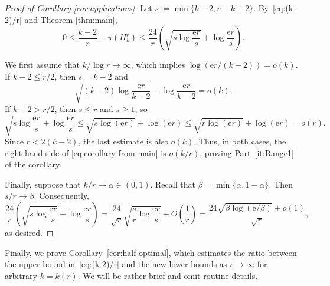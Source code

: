 \documentclass[12pt,a4paper]{article}
\numberwithin{equation}{section}
\theoremstyle{definition}
\theoremstyle{remark}
\newcommand{\hide}[1]{{\color{DarkGreen}#1}}
\renewcommand{\hide}[1]{}
\newcommand{\me}{\mathrm{e}}
\renewcommand{\longrightarrow}{\to}
\begin{document}
\begin{proof}[Proof of Corollary \ref{cor:applications}]
Let $s:=\min\{k-2,r-k+2\}$.
By~\eqref{eq:(k-2)/r} and Theorem \ref{thm:main},
\begin{equation}\label{eq:corollary-from-main}
0\le \frac{k-2}{r}-\pi(H_k^r)
\le \frac{24}{r}
\left(
\sqrt{s\log\frac{\me r}{s}}
+\log\frac{\me r}{s}
\right).
\end{equation}

\hide{
Suppose first that $k/\log r\to c\in(0,\infty)$. 
Then $(k-2)/\log r\to c$ and $k=o(r)$, so $s=k-2$ for all sufficiently large $r$. 
Moreover,
$$\frac{\log(\me r/(k-2))}{\log r}=1+\frac{1-\log(k-2)}{\log r}\longrightarrow 1.$$
It follows that
$$\frac{\log(\me r/(k-2))}{k-2}\longrightarrow \frac1c.$$
Multiplying \eqref{eq:corollary-from-main} by $r/(k-2)$, we obtain
$$0\le1-\frac{r\pi(H_k^r)}{k-2}\le24\left(\sqrt{\frac{\log(\me r/(k-2))}{k-2}}+\frac{\log(\me r/(k-2))}{k-2}\right).$$
Consequently,
$$0\le 1-\frac{r\pi(H_k^r)}{k-2}\le 24\left(c^{-1/2}+c^{-1}\right)+o(1),$$
which proves Part \textup{(i)} of Corollary \ref{cor:applications}.
}


We first assume that $k/\log r\to\infty$, which implies $\log(\me r/(k-2))=o(k)$.
If $k-2\le r/2$, then $s=k-2$ and
$$\sqrt{(k-2)\log\frac{\me r}{k-2}}+\log\frac{\me r}{k-2}=o(k).$$
If $k-2>r/2$, then $s\le r$ and $s\ge1$, so
$$\sqrt{s\log\frac{\me r}{s}}+\log\frac{\me r}{s}
\le \sqrt{s\log(\me r)}+\log(\me r)
\le \sqrt{r\log(\me r)}+\log(\me r)=o(r).$$
Since $r<2(k-2)$, the last estimate is also $o(k)$.
Thus, in both cases, the right-hand side of
\eqref{eq:corollary-from-main} is $o(k/r)$, proving
Part~\ref{it:Range1} of the corollary.

Finally, suppose that $k/r\to\alpha\in(0,1)$. Recall that $\beta=\min\{\alpha,1-\alpha\}$. 
Then $s/r\to\beta$.
Consequently,
$$
\frac{24}{r} \left(\sqrt{s\log\frac{\me r}{s}}+\log\frac{\me r}{s}\right)
=\frac{24}{\sqrt r}\sqrt{\frac{s}{r}\log\frac{\me r}{s}}+O\left(\frac1r\right)
=\frac{24\sqrt{\beta\log(\me /\beta)}+o(1)}{\sqrt r},$$
as desired.
\end{proof}

Finally, we prove Corollary~\ref{cor:half-optimal}, which estimates the ratio between the upper bound in~\eqref{eq:(k-2)/r} and the new lower bounds as $r\to\infty$ for arbitrary $k=k(r)$. 
We will be rather brief and omit routine details.
\end{document}
